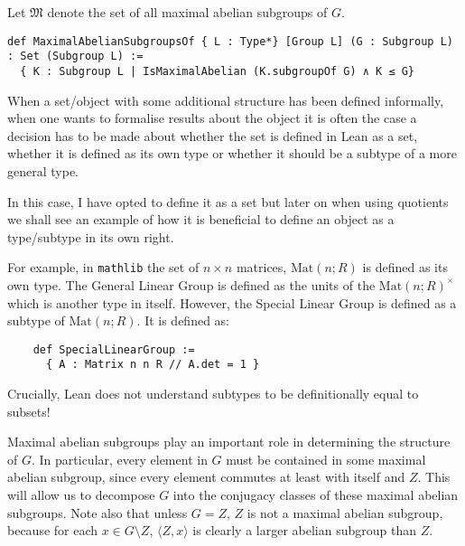 \begin{definition}
\label{MaximalAbelianSubgroupsOf}
\leanok
Let $\mathfrak{M}$ denote the set of all maximal abelian subgroups of $G$.
\end{definition}
\begin{footnotesize}
\begin{verbatim}
def MaximalAbelianSubgroupsOf { L : Type*} [Group L] (G : Subgroup L) : Set (Subgroup L) :=
  { K : Subgroup L | IsMaximalAbelian (K.subgroupOf G) ∧ K ≤ G}
\end{verbatim}
\end{footnotesize}

\begin{remark}
  When a set/object with some additional structure has been defined informally, when one wants to formalise results about the object it is often the case a decision has to be made
  about whether the set is defined in Lean as a set, whether it is defined as its own type or whether it should be a subtype of a more general type. 
  
  In this case, I have opted to define it as a set but later on when using quotients we shall see an example
  of how it is beneficial to define an object as a type/subtype in its own right.
\end{remark}

\begin{example}
  For example, in \texttt{mathlib} the set of $n \times n$ matrices, $\textrm{Mat}(n; R)$ is defined as its own type. The General Linear Group is defined as the units
  of the $\textrm{Mat}(n; R)^\times$ which is another type in itself. However, the Special Linear Group is defined as a subtype of $\textrm{Mat}(n; R)$. It is defined as:

  \begin{footnotesize}
  \begin{verbatim}
    def SpecialLinearGroup :=  
      { A : Matrix n n R // A.det = 1 }
  \end{verbatim}

  Crucially, Lean does not understand subtypes to be definitionally equal to subsets! 
  \end{footnotesize}
\end{example}

\vspace{3mm}

Maximal abelian subgroups play an important role in determining the structure of $G$. 
In particular, every element in $G$ must be contained in some maximal abelian subgroup, since every element commutes at least with itself and $Z$.
This will allow us to decompose $G$ into the conjugacy classes of these maximal abelian subgroups. Note also that unless $G=Z$, $Z$ is not a maximal abelian subgroup, because for each $x \in G \! \setminus \! Z$, $\langle Z,x \rangle$ is clearly a larger abelian subgroup than $Z$. \\


